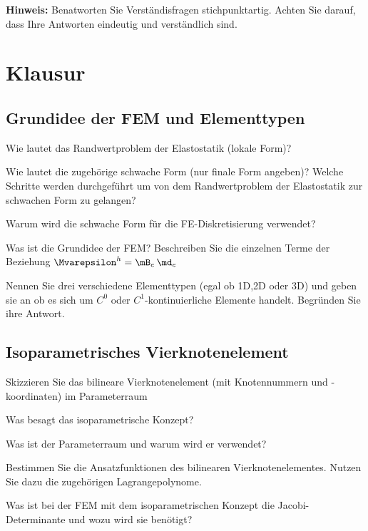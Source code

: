 \clearpage
\setcounter{page}{1}

\textbf{Hinweis: }Benatworten Sie Verständisfragen stichpunktartig. 
Achten Sie darauf, dass Ihre Antworten eindeutig und verständlich sind.


\section{Klausur}

\clearpage
\subsection{Grundidee der FEM und Elementtypen}


\enab
\item Wie lautet das Randwertproblem der Elastostatik (lokale Form)?
\item Wie lautet die zugehörige schwache Form (nur finale Form angeben)? 
      Welche Schritte werden durchgeführt um von dem Randwertproblem der Elastostatik zur schwachen Form zu gelangen? 
\item Warum wird die schwache Form für die FE-Diskretisierung verwendet?
% 
\item Was ist die Grundidee der FEM? 
      Beschreiben Sie die einzelnen Terme der Beziehung $\Mvarepsilon^h=\mB_e\,\md_e$ 
\item Nennen Sie drei verschiedene Elementtypen (egal ob 1D,2D oder 3D) und geben sie an ob es sich um $C^0$ oder $C^1$-kontinuierliche Elemente handelt.
      Begründen Sie ihre Antwort.


\enae


\clearpage

\subsection{Isoparametrisches Vierknotenelement}

\enab
\item Skizzieren Sie das bilineare Vierknotenelement (mit Knotennummern und -koordinaten) im Parameterraum
\item Was besagt das isoparametrische Konzept?
\item Was ist der Parameterraum und warum wird er verwendet?
\item Bestimmen Sie die Ansatzfunktionen des bilinearen Vierknotenelementes.
Nutzen Sie dazu die zugehörigen Lagrangepolynome.
\item Was ist bei der FEM mit dem isoparametrischen Konzept die Jacobi-Determinante und wozu wird sie benötigt?
\enae

